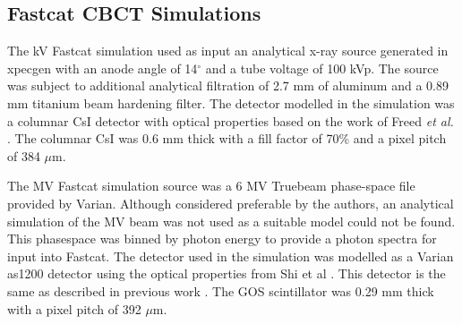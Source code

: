 \subsection{Fastcat CBCT Simulations}


The kV Fastcat simulation used as input an analytical x-ray source generated in xpecgen \cite{Hernandez2016Xpecgen:Anodes} with an anode angle of 14$^{\circ}$ and a tube voltage of 100 kVp. The source was subject to additional analytical filtration of 2.7 mm of aluminum and a 0.89 mm titanium beam hardening filter. The detector modelled in the simulation was a columnar CsI detector with optical properties based on the work of Freed \textit{et al.} \cite{Freed2009ExperimentalScreens}. The columnar CsI was 0.6 mm thick with a fill factor of 70\% and a pixel pitch of 384 $\mu$m.



The MV Fastcat simulation source was a 6 MV Truebeam phase-space file provided by Varian. Although considered preferable by the authors, an analytical simulation of the MV beam was not used as a suitable model could not be found. This phasespace was binned by photon energy to provide a photon spectra for input into Fastcat. The detector used in the simulation was modelled as a Varian as1200 detector using the optical properties from Shi et al \cite{Shi2018APerformance}. This detector is the same as described in previous work \cite{OConnell2021FastCAT:Simulation}. The GOS scintillator was 0.29 mm thick with a pixel pitch of 392 $\mu$m.


